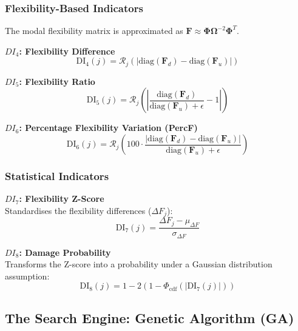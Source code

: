 \documentclass[a4paper,fleqn,nologo]{cas-dc}
\begin{document}
\subsubsection{Flexibility-Based Indicators}
The modal flexibility matrix is approximated as $\mathbf{F} \approx \boldsymbol{\Phi} \boldsymbol{\Omega}^{-2} \boldsymbol{\Phi}^T$.

\textbf{$DI_4$: Flexibility Difference} \\
\begin{equation}
    \text{DI}_4(j) = \mathcal{R}_j \left( | \text{diag}(\mathbf{F}_d) - \text{diag}(\mathbf{F}_u) | \right)
\end{equation}

\textbf{$DI_5$: Flexibility Ratio} \\
\begin{equation}
    \text{DI}_5(j) = \mathcal{R}_j \left( \left| \frac{\text{diag}(\mathbf{F}_d)}{\text{diag}(\mathbf{F}_u) + \epsilon} - 1 \right| \right)
\end{equation}

\textbf{$DI_6$: Percentage Flexibility Variation (PercF)} \\
\begin{equation}
    \text{DI}_6(j) = \mathcal{R}_j \left( 100 \cdot \frac{| \text{diag}(\mathbf{F}_d) - \text{diag}(\mathbf{F}_u) |}{\text{diag}(\mathbf{F}_u) + \epsilon} \right)
\end{equation}

\subsubsection{Statistical Indicators}

\textbf{$DI_7$: Flexibility Z-Score} \\
Standardises the flexibility differences ($\Delta F_j$):
\begin{equation}
    \text{DI}_7(j) = \frac{\Delta F_j - \mu_{\Delta F}}{\sigma_{\Delta F}}
\end{equation}

\textbf{$DI_8$: Damage Probability} \\
Transforms the Z-score into a probability under a Gaussian distribution assumption:
\begin{equation}
    \text{DI}_8(j) = 1 - 2\left( 1 - \Phi_{\text{cdf}}(|\text{DI}_7(j)|) \right)
\end{equation}

\subsection{The Search Engine: Genetic Algorithm (GA)}
\end{document}

